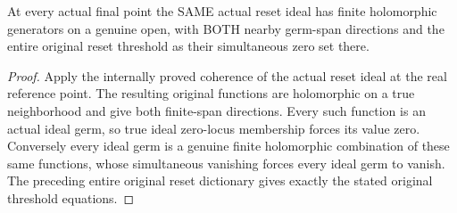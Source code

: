\begin{theorem}
\label{hir:original-step-one-special-reset-local-equations}
\leanok
{}
At every actual final point the SAME actual reset ideal has finite holomorphic
generators on a genuine open, with BOTH nearby germ-span directions and the
entire original reset threshold as their simultaneous zero set there.
\end{theorem}
\begin{proof}
Apply the internally proved coherence of the actual reset ideal at the real
reference point. The resulting original functions are holomorphic on a true
neighborhood and give both finite-span directions. Every such function is an
actual ideal germ, so true ideal zero-locus membership forces its value zero.
Conversely every ideal germ is a genuine finite holomorphic combination of
these same functions, whose simultaneous vanishing forces every ideal germ
to vanish. The preceding entire original reset dictionary gives exactly the
stated original threshold equations.
\end{proof}

